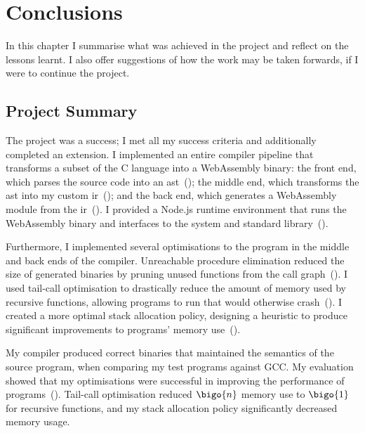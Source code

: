\documentclass[00-main.tex]{subfiles}
\begin{document}
\chapter{Conclusions}

In this chapter I summarise what was achieved in the project and reflect on the lessons learnt.
I also offer suggestions of how the work may be taken forwards, if I were to continue the project.

\section{Project Summary}

The project was a success; I met all my success criteria and additionally completed an extension.
I implemented an entire compiler pipeline that transforms a subset of the C language into a WebAssembly binary: the front end, which parses the source code into an \gls{ast}~(); the middle end, which transforms the \gls{ast} into my custom \gls{ir}~(); and the back end, which generates a WebAssembly module from the \gls{ir}~().
I provided a Node.js runtime environment that runs the WebAssembly binary and interfaces to the system and standard library~().

Furthermore, I implemented several optimisations to the program in the middle and back ends of the compiler.
Unreachable procedure elimination reduced the size of generated binaries by pruning unused functions from the call graph~().
I used tail-call optimisation to drastically reduce the amount of memory used by recursive functions, allowing programs to run that would otherwise crash~().
I created a more optimal stack allocation policy, designing a heuristic to produce significant improvements to programs' memory use~().

My compiler produced correct binaries that maintained the semantics of the source program, when comparing my test programs against GCC\@.
My evaluation showed that my optimisations were successful in improving the performance of programs~().
Tail-call optimisation reduced $\bigo{n}$ memory use to $\bigo{1}$ for recursive functions, and my stack allocation policy significantly decreased memory usage.
\end{document}
